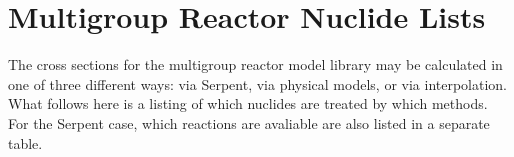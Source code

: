 \chapter{Multigroup Reactor Nuclide Lists}
\label{appendix_rmg_nuclide_lists}

The cross sections for the multigroup reactor model library may be calculated in one of three different ways: 
via Serpent, via physical models, or via interpolation.  What follows here is a listing of which nuclides
are treated by which methods.  For the Serpent case, which reactions are avaliable are also listed in a 
separate table.

\vspace{1em}







\clearpage



